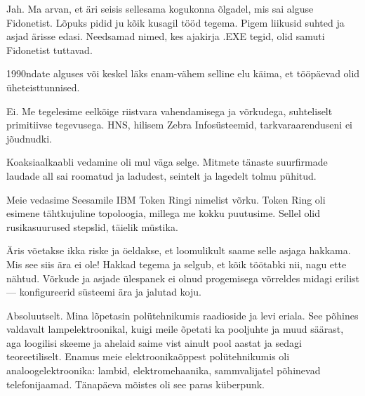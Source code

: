
Jah. Ma arvan, et äri seisis sellesama kogukonna õlgadel, mis sai alguse Fidonetist. Lõpuks pidid ju kõik kusagil tööd tegema. Pigem liikusid
suhted ja asjad ärisse edasi. Needsamad nimed, kes ajakirja .EXE tegid, olid samuti Fidonetist tuttavad. 


1990ndate alguses või keskel läks enam-vähem selline elu käima, et tööpäevad olid üheteisttunnised. 


Ei. Me tegelesime eelkõige riistvara vahendamisega ja võrkudega, 
suhteliselt primitiivse tegevusega. HNS, hilisem Zebra 
Infosüsteemid, tarkvaraarenduseni ei jõudnudki.


Koaksiaalkaabli vedamine oli mul väga selge. Mitmete tänaste suurfirmade 
laudade all sai roomatud ja ladudest, seintelt ja lagedelt tolmu pühitud.


Meie vedasime Seesamile IBM Token Ringi 
nimelist võrku. Token Ring oli esimene tähtkujuline topoloogia, millega me kokku puutusime. Sellel 
olid rusikasuurused stepslid, täielik müstika.
 

Äris võetakse ikka riske ja öeldakse, et loomulikult saame selle asjaga hakkama. Mis see siis ära 
ei ole! Hakkad tegema ja selgub, et kõik töötabki nii, nagu ette nähtud.
Võrkude ja asjade ülespanek ei olnud progemisega võrreldes midagi
erilist --- konfigureerid süsteemi ära ja jalutad koju.


Absoluutselt. Mina lõpetasin polütehnikumis 
raadioside ja levi eriala. See põhines valdavalt lampelektroonikal, kuigi 
meile õpetati ka pooljuhte ja muud säärast, aga loogilisi skeeme ja
ahelaid saime vist ainult pool aastat ja sedagi 
teoreetiliselt. Enamus meie elektroonikaõppest polütehnikumis oli 
analoogelektroonika: lambid, elektromehaanika, sammvalijatel 
põhinevad telefonijaamad. Tänapäeva mõistes oli see paras küberpunk. 

